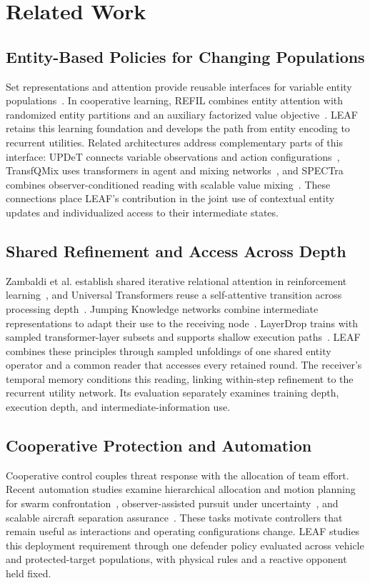 \section{Related Work}
\subsection{Entity-Based Policies for Changing Populations}
Set representations and attention provide reusable interfaces for variable entity populations~\cite{zaheer2017deepsets,lee2019settransformer}. In cooperative learning, REFIL combines entity attention with randomized entity partitions and an auxiliary factorized value objective~\cite{iqbal2021refil}. LEAF retains this learning foundation and develops the path from entity encoding to recurrent utilities. Related architectures address complementary parts of this interface: UPDeT connects variable observations and action configurations~\cite{hu2021updet}, TransfQMix uses transformers in agent and mixing networks~\cite{transfqmix2023}, and SPECTra combines observer-conditioned reading with scalable value mixing~\cite{park2026spectra}. These connections place LEAF's contribution in the joint use of contextual entity updates and individualized access to their intermediate states.

\subsection{Shared Refinement and Access Across Depth}
Zambaldi et al. establish shared iterative relational attention in reinforcement learning~\cite{zambaldi2019relational}, and Universal Transformers reuse a self-attentive transition across processing depth~\cite{dehghani2019universal}. Jumping Knowledge networks combine intermediate representations to adapt their use to the receiving node~\cite{xu2018jk}. LayerDrop trains with sampled transformer-layer subsets and supports shallow execution paths~\cite{fan2020layerdrop}. LEAF combines these principles through sampled unfoldings of one shared entity operator and a common reader that accesses every retained round. The receiver's temporal memory conditions this reading, linking within-step refinement to the recurrent utility network. Its evaluation separately examines training depth, execution depth, and intermediate-information use.

\subsection{Cooperative Protection and Automation}
Cooperative control couples threat response with the allocation of team effort. Recent automation studies examine hierarchical allocation and motion planning for swarm confrontation~\cite{wu2025swarm}, observer-assisted pursuit under uncertainty~\cite{liu2025observer}, and scalable aircraft separation assurance~\cite{brittain2022separation}. These tasks motivate controllers that remain useful as interactions and operating configurations change. LEAF studies this deployment requirement through one defender policy evaluated across vehicle and protected-target populations, with physical rules and a reactive opponent held fixed.
